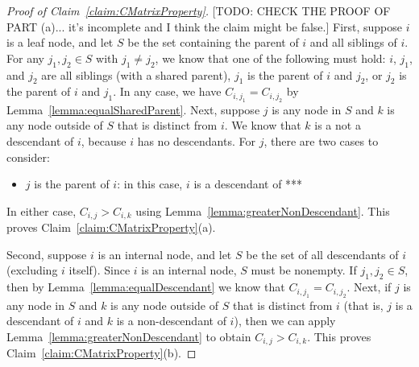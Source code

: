 \documentclass{article}
\theoremstyle{definition}
\begin{document}
\begin{proof}[Proof of Claim~\ref{claim:CMatrixProperty}]
[TODO: CHECK THE PROOF OF PART (a)... it's incomplete and I think the claim might be false.]
First, suppose $i$ is a leaf node, and let $S$ be the set containing the parent of $i$ and all siblings of $i$.
For any $j_1, j_2 \in S$ with $j_1 \neq j_2$, we know that one of the following must hold: $i$, $j_1$, and $j_2$ are all siblings (with a shared parent), $j_1$ is the parent of $i$ and $j_2$, or $j_2$ is the parent of $i$ and $j_1$.
In any case, we have $C_{i,j_1} = C_{i,j_2}$ by Lemma~\ref{lemma:equalSharedParent}.
Next, suppose $j$ is any node in $S$ and $k$ is any node outside of $S$ that is distinct from $i$.
We know that $k$ is a not a descendant of $i$, because $i$ has no descendants.
For $j$, there are two cases to consider:
\begin{itemize}
 \item $j$ is the parent of $i$: in this case, $i$ is a descendant of ***
\end{itemize}
In either case, $C_{i,j} > C_{i,k}$ using Lemma~\ref{lemma:greaterNonDescendant}.
This proves Claim~\ref{claim:CMatrixProperty}(a).

Second, suppose $i$ is an internal node, and let $S$ be the set of all descendants of $i$ (excluding $i$ itself).
Since $i$ is an internal node, $S$ must be nonempty.
If $j_1, j_2 \in S$, then by Lemma~\ref{lemma:equalDescendant} we know that $C_{i,j_1} = C_{i,j_2}$.
Next, if $j$ is any node in $S$ and $k$ is any node outside of $S$ that is distinct from $i$ (that is, $j$ is a descendant of $i$ and $k$ is a non-descendant of $i$), then we can apply Lemma~\ref{lemma:greaterNonDescendant} to obtain $C_{i,j} > C_{i,k}$.
This proves Claim~\ref{claim:CMatrixProperty}(b).
\end{proof}
\end{document}
